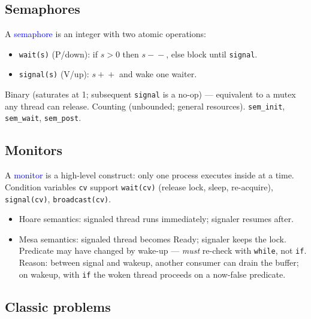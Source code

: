 \subsection{Semaphores}
A \textcolor{Blue}{semaphore} is an integer with two atomic operations:
\begin{itemize}
  \item \texttt{\textcolor{Bittersweet}{wait}(s)} (P/down): if $s>0$ then $s\!-\!-$, else block until \texttt{signal}.
  \item \texttt{\textcolor{Bittersweet}{signal}(s)} (V/up): $s\!+\!+$ and wake one waiter.
\end{itemize}
\textcolor{Bittersweet}{Binary} (saturates at 1; subsequent \texttt{signal} is a no-op) — equivalent to a mutex any thread can release. \textcolor{Bittersweet}{Counting} (unbounded; general resources). \texttt{sem\_init}, \texttt{sem\_wait}, \texttt{sem\_post}.

\subsection{Monitors}
A \textcolor{Blue}{monitor} is a high-level construct: only one process executes inside at a time. \textcolor{Bittersweet}{Condition variables} \texttt{cv} support \texttt{\textcolor{Bittersweet}{wait}(cv)} (release lock, sleep, re-acquire), \texttt{\textcolor{Bittersweet}{signal}(cv)}, \texttt{\textcolor{Bittersweet}{broadcast}(cv)}.
\begin{itemize}
  \item \textcolor{Bittersweet}{Hoare semantics}: signaled thread runs immediately; signaler resumes after.
  \item \textcolor{Bittersweet}{Mesa semantics}: signaled thread becomes Ready; signaler keeps the lock. Predicate may have changed by wake-up — \emph{must} re-check with \texttt{while}, not \texttt{if}. Reason: between signal and wakeup, another consumer can drain the buffer; on wakeup, with \texttt{if} the woken thread proceeds on a now-false predicate.
\end{itemize}

\subsection{Classic problems}


